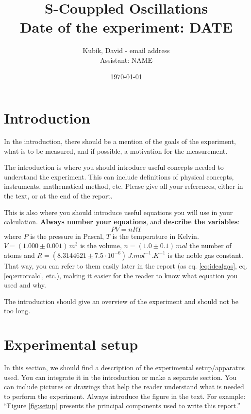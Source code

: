 \documentclass[11pt, a4paper]{article}
\title{\textbf{S-Couppled Oscillations} \\
	\normalsize{Date of the experiment: DATE}} %
\date{\today}  %
\author{\normalsize{Kubik, David - email address} \\ %
	    \normalsize{Assistant: NAME}} %
\begin{document}
\maketitle


\section*{Introduction} %

In the introduction, there should be a mention of the goals of the experiment, what is to be measured, and if possible, a motivation for the measurement. 

The introduction is where you should introduce useful concepts needed to understand the experiment. This can include definitions of physical concepts, instruments, mathematical method, etc. Please give all your references, either in the text, or at the end of the report.

This is also where you should introduce useful equations you will use in your calculation. \textbf{Always number your equations}, and \textbf{describe the variables}:
\begin{equation} \label{eq:idealgas}
	P V = n R T	
\end{equation}
where $P$ is the pressure in Pascal, $T$ is the temperature in Kelvin. $V=(1.000 \pm 0.001) \, \si{m^3}$ 
is the volume, $n = (1.0 \pm 0.1) \, \si{mol}$ the number of atoms and 
$R = (8.3144621 \pm 7.5\cdot10^{-6}) \, \si{J.mol^{-1}.K^{-1}}$ \cite{nist} is the noble gas constant. That way, you can refer to them easily later in the report (as eq. \ref{eq:idealgas}, eq. \ref{eq:errorcalc}, etc.), making it easier for the reader to know what equation you used and why.

The introduction should give an overview of the experiment and should not be too long.


\section*{Experimental setup} %

In this section, we should find a description of the experimental setup/apparatus used.
You can integrate it in the introduction or make a separate section. You can include pictures or drawings
that help the reader understand what is needed to perform the experiment. Always introduce the figure in the
text. For example: ``Figure \ref{fig:setup} presents the principal components used to write this report.''
\end{document}
